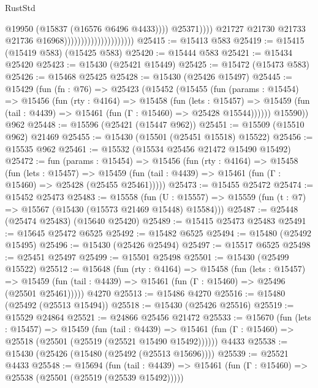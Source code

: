 \begin{lexlean}{RustStd}
\begin{coremodule}
                                                          @19950
                                                          (@15837 (@16576 @6496 @4433))))
                                                      @25371))))
                                              @21727
                                              @21730
                                              @21733
                                              @21736
                                              @16968)))))))))))))))))))))
@25415 := @15413 @583
@25419 := @15415 (@15419 @583) (@15425 @583)
@25420 := @15444 @583
@25421 := @15434 @25420
@25423 := @15430 (@25421 @15449)
@25425 := @15472 (@15473 @583)
@25426 := @15468 @25425
@25428 := @15430 (@25426 @15497)
@25445 := @15429
    (fun (fn : @76) =>
    @25423
      (@15452
        (@15455
          (fun (params : @15454) =>
          @15456
            (fun (rty : @4164) =>
            @15458
              (fun (lets : @15457) =>
              @15459 (fun (tail : @4439) => @15461 (fun (Γ : @15460) => @25428 @15544))))))
        @15590))
    @962
@25448 := @15596 (@25421 (@15447 @962))
@25451 := @15509 (@15510 @962) @21469
@25455 := @15430 (@15501 (@25451 @15518) @15522)
@25456 := @15535 @962
@25461 := @15532 (@15534 @25456 @21472 @15490 @15492)
@25472 := fun (params : @15454) =>
  @15456
    (fun (rty : @4164) =>
    @15458
      (fun (lets : @15457) =>
      @15459 (fun (tail : @4439) => @15461 (fun (Γ : @15460) => @25428 (@25455 @25461)))))
@25473 := @15455 @25472
@25474 := @15452 @25473
@25483 := @15558
    (fun (U : @15557) => @15559 (fun (t : @7) => @15567 (@15430 (@15573 @21469 @15448) @15584)))
@25487 := @25448 (@25474 @25483) (@15640 @25420)
@25489 := @15415 @25473 @25483
@25491 := @15645 @25472 @6525
@25492 := @15482 @6525
@25494 := @15480 (@25492 @15495)
@25496 := @15430 (@25426 @25494)
@25497 := @15517 @6525
@25498 := @25451 @25497
@25499 := @15501 @25498
@25501 := @15430 (@25499 @15522)
@25512 := @15648
    (fun (rty : @4164) =>
    @15458
      (fun (lets : @15457) =>
      @15459 (fun (tail : @4439) => @15461 (fun (Γ : @15460) => @25496 (@25501 @25461)))))
    @4270
@25513 := @15486 @4270
@25516 := @15480 (@25492 (@25513 @15494))
@25518 := @15430 (@25426 @25516)
@25519 := @15529 @24864
@25521 := @24866 @25456 @21472
@25533 := @15670
    (fun (lets : @15457) =>
    @15459
      (fun (tail : @4439) =>
      @15461 (fun (Γ : @15460) => @25518 (@25501 (@25519 (@25521 @15490 @15492))))))
    @4433
@25538 := @15430 (@25426 (@15480 (@25492 (@25513 @15696))))
@25539 := @25521 @4433
@25548 := @15694
    (fun (tail : @4439) => @15461 (fun (Γ : @15460) => @25538 (@25501 (@25519 (@25539 @15492)))))

\end{coremodule}
\end{lexlean}
